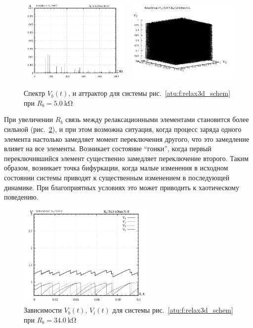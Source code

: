 \begin{figure}[htb!]
  \centerline{
    \includegraphics[width=0.48\textwidth]{p/relax3d_f_02.png}
    ~
    \includegraphics[width=0.48\textwidth]{p/relax3d_v1v2v3_02.png}
  }
  \caption{Спектр $V_b(t)$, и аттрактор для системы рис.~\ref{atu:f:relax3d_schem} при $R_b=\SI{5.0}{\kilo\ohm}$ }
  \label{atu:f:relax3d_f_02}
\end{figure}

При увеличении $R_b$ связь между релаксационными элементами становится более сильной
(рис.~\ref{atu:f:relax3d_t_08}), и при этом возможна ситуация, когда
процесс заряда одного элемента настолько замедляет момент переключения другого,
что это замедление влияет на все элементы. Возникает состояние ``гонки'',
когда первый переключившийся элемент существенно замедляет переключение второго.
Таким образом, возникает точка бифуркации, когда малые изменения
в исходном состоянии системы приводят к существенным изменением в последующей динамике.
При благоприятных условиях это может приводить к хаотическому поведению.


\begin{figure}[htb!]
  \centerline{\includegraphics[width=0.6\textwidth]{p/relax3d_t_08.png} }
  \caption{Зависимости $V_b(t)$, $V_i(t)$ для системы рис.~\ref{atu:f:relax3d_schem} при $R_b=\SI{34.0}{\kilo\ohm}$ }
  \label{atu:f:relax3d_t_08}
\end{figure}

